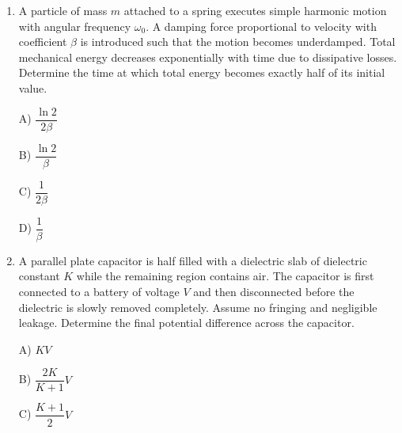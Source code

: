 \documentclass[12pt]{article}
\begin{document}
\begin{enumerate}
\begin{center}
\end{center}


A) $\dfrac{2}{3}$

B) $\dfrac{1}{2}$

C) $\dfrac{3}{4}$

D) $\dfrac{5}{6}$

\item

A particle of mass $m$ attached to a spring executes simple harmonic motion with angular frequency $\omega_0$. 
A damping force proportional to velocity with coefficient $\beta$ is introduced such that the motion becomes underdamped. 
Total mechanical energy decreases exponentially with time due to dissipative losses. 
Determine the time at which total energy becomes exactly half of its initial value.

A) $\dfrac{\ln2}{2\beta}$

B) $\dfrac{\ln2}{\beta}$

C) $\dfrac{1}{2\beta}$

D) $\dfrac{1}{\beta}$

\item

A parallel plate capacitor is half filled with a dielectric slab of dielectric constant $K$ while the remaining region contains air. 
The capacitor is first connected to a battery of voltage $V$ and then disconnected before the dielectric is slowly removed completely. 
Assume no fringing and negligible leakage. 
Determine the final potential difference across the capacitor.

A) $KV$

B) $\dfrac{2K}{K+1}V$

C) $\dfrac{K+1}{2}V$


\end{enumerate}
\end{document}
